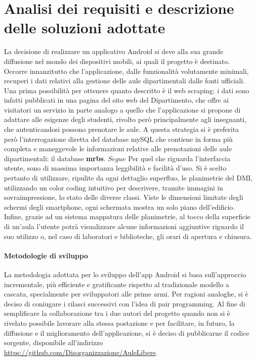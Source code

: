\documentclass{article}
\begin{document}
	\section{Analisi dei requisiti e descrizione delle soluzioni adottate} 
	La decisione di realizzare un applicativo Android si deve alla sua grande diffusione nel mondo dei dispositivi mobili, ai quali il progetto è destinato.
	Occorre innanzitutto che l'applicazione, dalle funzionalità volutamente minimali, recuperi i dati relativi alla gestione delle aule dipartimentali dalle fonti ufficiali. Una prima possibilità per ottenere quanto descritto è il web scraping: i dati sono infatti pubblicati in una pagina del sito web del Dipartimento, che offre ai visitatori un servizio in parte analogo a quello che l'applicazione si propone di adattare alle esigenze degli studenti, rivolto però principalmente agli insegnanti, che autenticandosi possono prenotare le aule. A questa strategia si è preferita però l'interrogazione diretta del database mySQL che contiene in forma più completa e maneggevole le informazioni relative alle prenotazioni delle aule dipartimentali: il database \textbf{mrbs}. $Segue$
	Per quel che riguarda l'interfaccia utente, sono di massima importanza leggibilità e facilità d'uso. Si è scelto pertanto di utilizzare, ripulite da ogni dettaglio superfluo, le planimetrie del DMI, utilizzando un color coding intuitivo per descrivere, tramite immagini in sovraimpressione, lo stato delle diverse classi. Viste le dimensioni limitate degli schermi degli smartphone, ogni schermata mostra un solo piano dell'edificio. Infine, grazie ad un sistema mappatura delle planimetrie, al tocco della superficie di un'aula l'utente potrà visualizzare alcune informazioni aggiuntive riguardo il suo utilizzo o, nel caso di laboratori e biblioteche, gli orari di apertura e chiusura.
	\paragraph{Metodologie di sviluppo}
	La metodologia adottata per lo sviluppo dell'app Android si basa sull'approccio incrementale, più efficiente e gratificante rispetto al tradizionale modello a cascata, specialmente per sviluppatori alle prime armi. Per ragioni analoghe, si è deciso di coniugare i rilasci successivi con l'idea di pair programming.
	Al fine di semplificare la collaborazione tra i due autori del progetto quando non si è rivelato possibile lavorare alla stessa postazione e per facilitare, in futuro, la diffusione e il miglioramento dell'applicazione, si è deciso di pubblicarne il codice sorgente, disponibile all'indirizzo \url{https://github.com/Disorganizzazione/AuleLibere}.
\end{document}
